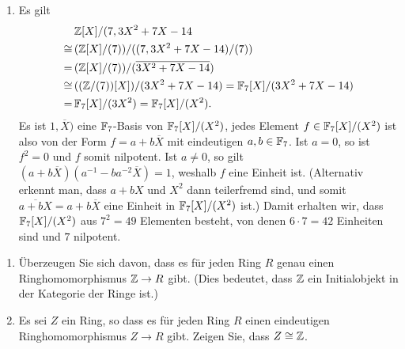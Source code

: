 \begin{solution}
\begin{enumerate}
    \item
      Es gilt
      \begin{align*}
             &\,  \mathbb{Z}[X]/(7, 3 X^2 + 7X - 14
        \\
        \cong&\,  ( \mathbb{Z}[X]/(7) ) / ( (7, 3 X^2 + 7X - 14 ) / (7) )
        \\
            =&\,  ( \mathbb{Z}[X]/(7) ) / ( \overline{3 X^2 + 7X - 14} )
        \\
        \cong&\,  ( (\mathbb{Z}/(7))[X] ) / (3 X^2 + 7X - 14)
            =     \mathbb{F}_7[X] / (3 X^2 + 7 X - 14)
        \\
            =&\,   \mathbb{F}_7[X] / (3 X^2)
            =     \mathbb{F}_7[X] / (X^2).
      \end{align*}
      Es ist $1, \overline{X})$ eine $\mathbb{F}_7$-Basis von $\mathbb{F}_7[X]/(X^2)$, jedes Element $f \in \mathbb{F}_7[X]/(X^2)$ ist also von der Form $f = a + b \overline{X}$ mit eindeutigen $a, b \in \mathbb{F}_7$.
      Ist $a = 0$, so ist $f^2 = 0$ und $f$ somit nilpotent.
      Ist $a \neq 0$, so gilt $(a + b\overline{X}) (a^{-1} - b a^{-2} \overline{X}) = 1$, weshalb $f$ eine Einheit ist.
      (Alternativ erkennt man, dass $a + b X$ und $X^2$ dann teilerfremd sind, und somit $\overline{a + b X} = a + b \overline{X}$ eine Einheit in $\mathbb{F}_7[X]/(X^2)$ ist.)
      Damit erhalten wir, dass $\mathbb{F}_7[X]/(X^2)$ aus $7^2 = 49$ Elementen besteht, von denen $6 \cdot 7 = 42$ Einheiten sind und $7$ nilpotent.
  \end{enumerate}
\end{solution}


\begin{question}[subtitle = Initialobjekte in der Kategorie der Ringe]
  \label{qst: Z is inital}
  \begin{enumerate}
    \item
      Überzeugen Sie sich davon, dass es für jeden Ring $R$ genau einen Ringhomomorphismus $\mathbb{Z} \to R$ gibt.
      (Dies bedeutet, dass $\mathbb{Z}$ ein Initialobjekt in der Kategorie der Ringe ist.)
    \item
      Es sei $Z$ ein Ring, so dass es für jeden Ring $R$ einen eindeutigen Ringhomomorphismus $Z \to R$ gibt.
      Zeigen Sie, dass $Z \cong \mathbb{Z}$.
  \end{enumerate}
\end{question}


